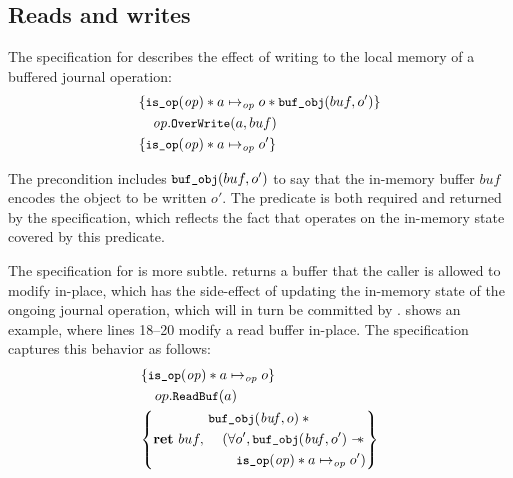 
\subsection{Reads and writes}
\label{s:design:read-write}

The specification for  describes the effect of writing to the
local memory of a buffered journal operation:
%
\begin{align*}
  \hoareV{\cc{is_op}(\mathit{op}) \sep a \mapsto_{\mathit{op}} o \sep \cc{buf_obj}(buf, o')}%
        {\mathit{op}.\cc{OverWrite}(a, buf)}%
        {\cc{is_op}(\mathit{op}) \sep a \mapsto_{\mathit{op}} o'}
\end{align*}

The precondition includes $\cc{buf_obj}(buf, o')$ to say that the in-memory
buffer $buf$ encodes the object to be written $o'$.
The  predicate is both
required and returned by the specification, which reflects the fact that
 operates on the in-memory state covered by
this predicate.

The specification for  is more subtle.  
returns a buffer that the caller is allowed to modify in-place, which
has the side-effect of updating the in-memory state of the ongoing journal operation, which
will in turn be committed by .   shows
an example, where lines 18--20 modify a read buffer in-place.  The specification
captures this behavior as follows:
%
\begin{align*}
  \hoareV{\cc{is_op}(\mathit{op}) \sep a \mapsto_{\mathit{op}} o}%
        {op.\cc{ReadBuf}(a)}%
        {\Ret{buf}
  \begin{aligned}
  &\cc{buf_obj}(\mathit{buf}, o) \sep \phantom{} \\
  &\quad( \forall o', \cc{buf_obj}(\mathit{buf}, o') \wand \\
  &\quad\quad \cc{is_op}(\mathit{op}) \sep a \mapsto_{\mathit{op}} o' )
    \end{aligned}}
\end{align*}

